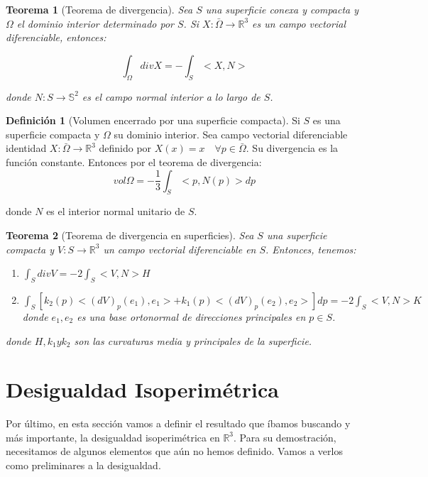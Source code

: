 \documentclass[paper=a4, fontsize=11pt, spanish]{scrartcl}
\newcommand{\rtres}{\mathbb{R}^3}
\newtheorem{theorem}{Teorema}[section]
\theoremstyle{definition}
\theoremstyle{definition}
\newtheorem{definition}{Definición}
\theoremstyle{definition}
\begin{document}
\begin{theorem}[Teorema de divergencia]
Sea $S$ una superficie conexa y compacta y $\Omega$ el dominio interior determinado por $S$. Si $X: \bar{\Omega} \longrightarrow \rtres$ es un campo vectorial diferenciable, entonces:

\begin{equation*}
    \int_\Omega div X = -\int_S <X,N>
\end{equation*}

donde $N: S \longrightarrow \mathbb{S}^2$ es el campo normal interior a lo largo de $S$.
\end{theorem}

\begin{definition}[Volumen encerrado por una superficie compacta]
Si $S$ es una superficie compacta y $\Omega$ su dominio interior. Sea campo vectorial diferenciable identidad $X: \bar{\Omega} \longrightarrow \rtres$ definido por $X(x) = x \quad \forall p \in \bar{\Omega}$. Su divergencia es la función constante. Entonces por el teorema de divergencia:
\begin{equation*}
    vol \Omega = - \frac{1}{3} \int_S <p, N(p)> dp
\end{equation*}

donde $N$ es el interior normal unitario de $S$.
\end{definition}

\begin{theorem}[Teorema de divergencia en superficies]
Sea $S$ una superficie compacta y $V: S \longrightarrow \rtres$ un campo vectorial diferenciable en $S$. Entonces, tenemos:

\begin{enumerate}
    \item $\int_S div V = -2 \int_S<V,N>H$
    \item $\int_S [k_2(p)<(dV)_p(e_1),e_1> + k_1(p)<(dV)_p(e_2),e_2>]dp = -2 \int_S<V,N>K$ donde ${e_1,e_2}$ es una base ortonormal de direcciones principales en $p \in S$.
\end{enumerate}

donde $H, k_1 y k_2$ son las curvaturas media y principales de la superficie.
\end{theorem}

\section{Desigualdad Isoperimétrica}
Por último, en esta sección vamos a definir el resultado que íbamos buscando y  más importante, la desigualdad isoperimétrica en $\rtres$. Para su demostración, necesitamos de algunos elementos que aún no hemos definido. Vamos a verlos como preliminares a la desigualdad.
\end{document}
